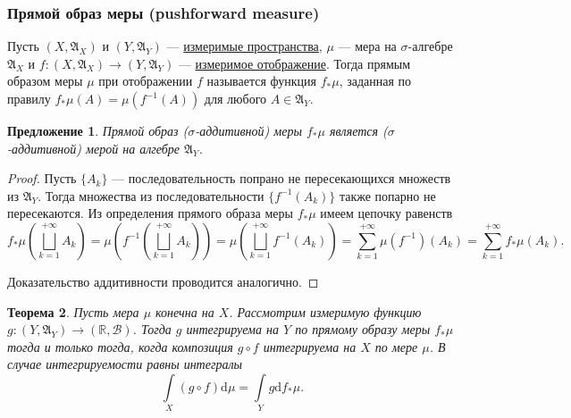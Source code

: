 \documentclass[12pt]{article}
\newtheorem{theorem}{Теорема}
\newtheorem{proposition}[theorem]{Предложение}
\numberwithin{theorem}{section}
\theoremstyle{definition}
\newcommand{\defin}[2]{\hypertarget{#2}{{\color{red} #1}}}
\newcommand{\RR}{\mathbb{R}}
\newcommand{\setsigmaalg}{\mathfrak{A}}
\newcommand{\calB}{\mathcal{B}}
\newcommand{\diff}{\mathrm{d}}
\begin{document}
	\subsubsection{Прямой образ меры (pushforward measure)}
	
	Пусть $ (X, \setsigmaalg_X) $ и $ (Y, \setsigmaalg_Y) $ --- \hyperlink{measurable-space}{измеримые пространства},
	$ \mu $ --- мера на $ \sigma $-алгебре $ \setsigmaalg_X $ и $ f \colon (X, \setsigmaalg_X) \to (Y, \setsigmaalg_Y) $
	--- \hyperlink{morphism-of-measurable-spaces}{измеримое отображение}.
	Тогда \defin{прямым образом меры $ \mu $ при отображении $ f $}{pushforward-measure} называется функция $ f_{*}\mu $,
	заданная по правилу $ f_*\mu(A) = \mu(f^{-1}(A)) $ для любого $ A \in \setsigmaalg_Y $.
	
	\begin{proposition}
		Прямой образ ($ \sigma $-аддитивной) меры $ f_*\mu $ является ($ \sigma $-аддитивной) мерой на алгебре $ \setsigmaalg_Y $.
	\end{proposition}
	
	\begin{proof}
		Пусть $ \{A_k\} $ --- последовательность попрано не пересекающихся множеств из $ \setsigmaalg_Y $.
		Тогда множества из последовательности $ \{f^{-1}(A_k)\} $ также попарно не пересекаются. 
		Из определения прямого образа меры $ f_{*}\mu $ имеем цепочку равенств
		$$ f_*\mu\left(\bigsqcup\limits_{k = 1}^{+\infty} A_k\right) 
		= \mu\left(f^{-1}\left(\bigsqcup\limits_{k = 1}^{+\infty} A_k\right)\right)
		= \mu\left(\bigsqcup\limits_{k = 1}^{+\infty} f^{-1}(A_k)\right)
		= \sum\limits_{k = 1}^{+\infty} \mu(f^{-1})(A_k)
		= \sum\limits_{k = 1}^{+\infty} f_{*}\mu(A_k). $$
		
		Доказательство аддитивности проводится аналогично.
	\end{proof}
	
	\begin{theorem} \label{pushforward measure main property}
		Пусть мера $ \mu $ конечна на $ X $.
		Рассмотрим измеримую функцию $ g \colon (Y, \setsigmaalg_Y) \to (\RR, \calB) $.
		Тогда $ g $ интегрируема на $ Y $ по прямому образу меры $ f_*\mu $
		тогда и только тогда, когда композиция $ g \circ f $ интегрируема на $ X $ по мере $ \mu $.
		В случае интегрируемости равны интегралы
		$$ \int\limits_{X} (g \circ f)\diff\mu = \int\limits_{Y} g\diff f_*\mu. $$
	\end{theorem}
	
\end{document}
